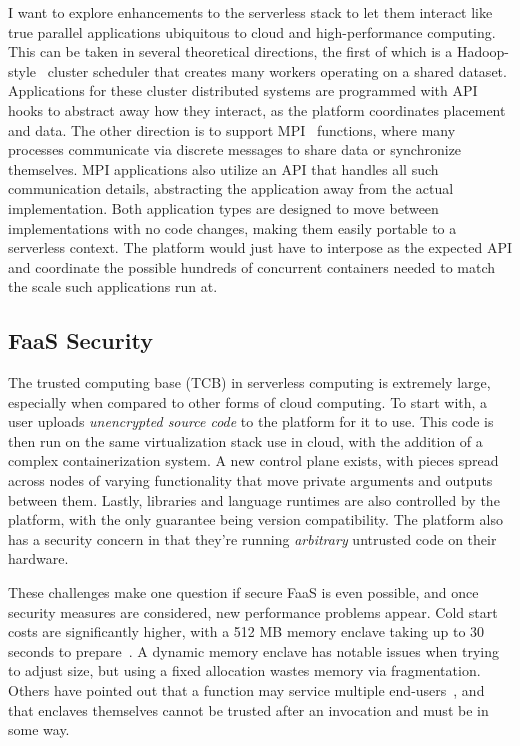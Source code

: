 I want to explore enhancements to the serverless stack to let them interact like true parallel applications ubiquitous to cloud and high-performance computing.
This can be taken in several theoretical directions, the first of which is a Hadoop-style~\cite{hadoop} cluster scheduler that creates many workers operating on a shared dataset.
Applications for these cluster distributed systems are programmed with API hooks to abstract away how they interact, as the platform coordinates placement and data.
The other direction is to support MPI~\cite{mpi} functions, where many processes communicate via discrete messages to share data or synchronize themselves.
MPI applications also utilize an API that handles all such communication details, abstracting the application away from the actual implementation.
Both application types are designed to move between implementations with no code changes, making them easily portable to a serverless context.
The platform would just have to interpose as the expected API and coordinate the possible hundreds of concurrent containers needed to match the scale such applications run at.

\subsection{FaaS Security}

The trusted computing base (TCB) in serverless computing is extremely large, especially when compared to other forms of cloud computing.
To start with, a user uploads \emph{unencrypted source code} to the platform for it to use.
This code is then run on the same virtualization stack use in cloud, with the addition of a complex containerization system.
A new control plane exists, with pieces spread across nodes of varying functionality that move private arguments and outputs between them.
Lastly, libraries and language runtimes are also controlled by the platform, with the only guarantee being version compatibility. 
The platform also has a security concern in that they're running \emph{arbitrary} untrusted code on their hardware.

These challenges make one question if secure FaaS is even possible, and once security measures are considered, new performance problems appear.
Cold start costs are significantly higher, with a 512 MB memory enclave taking up to 30 seconds to prepare~\cite{trach2019clemmys}.
A dynamic memory enclave has notable issues when trying to adjust size, but using a fixed allocation wastes memory via fragmentation.
Others have pointed out that a function may service multiple end-users~\cite{kim2023cryonics,zhao2023reusable}, and that enclaves themselves cannot be trusted after an invocation and must be  in some way.


